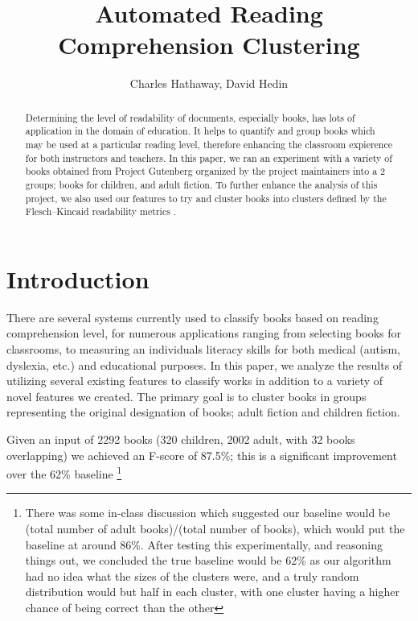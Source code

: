 \documentclass[]{article}
\title{Automated Reading Comprehension Clustering}
\author{Charles Hathaway, David Hedin}
\begin{document}
\maketitle

\begin{abstract}

Determining the level of readability of documents, especially books, has lots of application in the domain of education.
It helps to quantify and group books which may be used at a particular reading level, therefore enhancing the classroom expierence for both instructors and teachers.
In this paper, we ran an experiment with a variety of books obtained from Project Gutenberg \cite{gutenberg2015} organized by the project maintainers into a 2 groups; books for children, and adult fiction.
To further enhance the analysis of this project, we also used our features to try and cluster books into clusters defined by the Flesch–Kincaid readability metrics \cite{kincaid1975derivation}.

\end{abstract}

\section{Introduction}

There are several systems currently used to classify books based on reading comprehension level, for numerous applications ranging from selecting books for classrooms, to measuring an individuals literacy skills for both medical (autism, dyslexia, etc.) and educational purposes.
In this paper, we analyze the results of utilizing several existing features to classify works in addition to a variety of novel features we created.
The primary goal is to cluster books in groups representing the original designation of books; adult fiction and children fiction.

Given an input of 2292 books (320 children, 2002 adult, with 32 books overlapping) we achieved an F-score of 87.5\%; this is a significant improvement over the 62\% baseline \footnote{There was some in-class discussion which suggested our baseline would be (total number of adult books)/(total number of books), which would put the baseline at around 86\%. After testing this experimentally, and reasoning things out, we concluded the true baseline would be 62\% as our algorithm had no idea what the sizes of the clusters were, and a truly random distribution would but half in each cluster, with one cluster having a higher chance of being correct than the other}
\end{document}
